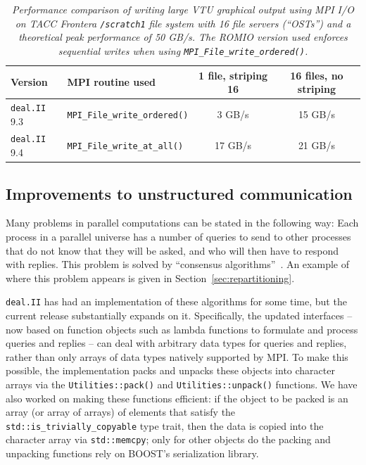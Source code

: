 \documentclass{ansarticle-preprint}
\newcommand{\specialword}[1]{\texttt{#1}}
\newcommand{\dealii}{{\specialword{deal.II}}\xspace}
\begin{document}
\begin{table}
  \caption{\it Performance comparison of writing large VTU graphical output using MPI I/O on
  TACC Frontera \texttt{/scratch1} file system with 16 file servers (``OSTs'') and a theoretical peak performance of 50 GB/s. The ROMIO version used enforces sequential writes when using \texttt{MPI\_File\_write\_ordered()}.}
  \label{tab:mpi-io}

  \centering

  \begin{tabular}{llcc}
    \toprule
    Version       & MPI routine used                     & 1 file, striping 16 & 16 files, no striping \\\midrule
    \dealii{} 9.3 & \texttt{MPI\_File\_write\_ordered()} & 3 GB/s              & 15 GB/s               \\
    \dealii{} 9.4 & \texttt{MPI\_File\_write\_at\_all()} & 17 GB/s             & 21 GB/s               \\
    \bottomrule
\end{tabular}

  \end{table}

\subsection{Improvements to unstructured communication}
\label{sec:CA}

Many problems in parallel computations can be stated in the following
way: Each process in a parallel universe has a number of queries to
send to other processes that do not know that they will be asked, and
who will then have to respond with replies. This problem is solved by
``consensus algorithms''~\cite{hoefler2010scalable}. An example of where this problem appears is
given in Section~\ref{sec:repartitioning}.

\dealii has had an implementation of these algorithms for some time,
but the current release substantially expands on it. Specifically, the
updated interfaces -- now based on function objects such as lambda
functions to formulate and process queries and replies -- can deal
with arbitrary data types for queries and replies, rather than only
arrays of data types natively supported by MPI. To make this possible,
the implementation packs and unpacks these objects into character
arrays via the \texttt{Utilities::pack()} and
\texttt{Utilities::unpack()} functions. We have also worked on making
these functions efficient: if the object to be packed is an array
(or array of arrays) of elements that satisfy the
\texttt{std::is\_trivially\_copyable} type trait, then the data is
copied into the character array via \texttt{std::memcpy}; only for
other objects do the packing and unpacking functions rely on BOOST's
serialization library.
\end{document}
